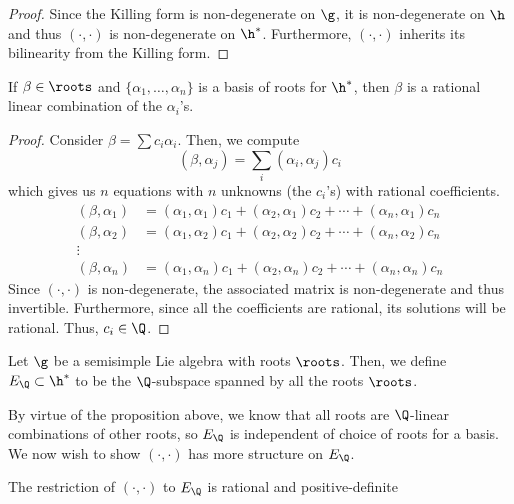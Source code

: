 \documentclass[11pt,leqno,oneside]{amsart}
\numberwithin{thm}{section}
\begin{document}
\begin{proof}
  Since the Killing form is non-degenerate on \(\g\), it is
  non-degenerate on \(\h\) and thus \((\cdot, \cdot)\) is
  non-degenerate on \(\h^*\). Furthermore, \((\cdot, \cdot)\) inherits
  its bilinearity from the Killing form. 
\end{proof}
\begin{lem}
  If \(\beta \in \roots\) and \(\{\alpha_1, \ldots, \alpha_n\}\) is a
  basis of roots for \(\h^*\), then \(\beta\) is a rational linear
  combination of the \(\alpha_i\)'s.
\end{lem}
\begin{proof}
  Consider \(\beta = \sum c_i \alpha_i\). Then, we compute \[
    (\beta, \alpha_j) = \sum_i (\alpha_i, \alpha_j)c_i
  \]
  which gives us \(n\) equations with \(n\) unknowns (the \(c_i\)'s)
  with rational coefficients.
  \begin{align*}
    (\beta, \alpha_1) & = (\alpha_1, \alpha_1)c_1 + (\alpha_2,
                        \alpha_1)c_2 + \cdots + (\alpha_n, \alpha_1)
                        c_n\\
    (\beta, \alpha_2) & = (\alpha_1, \alpha_2)c_1 + (\alpha_2,
                        \alpha_2)c_2 + \cdots + (\alpha_n, \alpha_2)
                        c_n\\
    \vdots & \\
    (\beta, \alpha_n) & = (\alpha_1, \alpha_n)c_1 + (\alpha_2,
                        \alpha_n)c_2 + \cdots + (\alpha_n, \alpha_n)
                        c_n
  \end{align*}
  Since \((\cdot, \cdot)\) is non-degenerate, the
  associated matrix is non-degenerate and thus
  invertible. Furthermore, since all the coefficients are rational,
  its solutions will be rational. Thus, \(c_i \in \Q\).
\end{proof}
\begin{defn}
  Let \(\g\) be a semisimple Lie algebra with roots \(\roots\). Then,
  we define \(E_\Q \subset \h^*\) to be the \(\Q\)-subspace spanned by
  all the roots \(\roots\).
\end{defn}
By virtue of the proposition above, we know that all roots are
\(\Q\)-linear combinations of other roots, so \(E_\Q\) is independent
of choice of roots for a basis. We now wish to show \((\cdot, \cdot)\) has
more structure on \(E_\Q\).
\begin{prop}
  The restriction of \((\cdot,\cdot)\) to
  \(E_\Q\) is rational and positive-definite
\end{prop}
\end{document}
